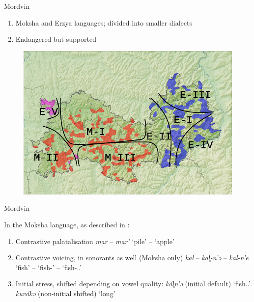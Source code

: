 \documentclass[10 pt, handout]{beamer}
\begin{document}
\begin{frame}{Mordvin}

	\begin{enumerate}[$\gg$]
		\item Moksha and Erzya languages; divided into smaller dialects
		\item Endangered but supported 
	\end{enumerate}
	
	\begin{figure}[H]
		\centering
		\includegraphics[scale=.3]{moksha-dialects}
	\end{figure}

\end{frame}

\begin{frame}{Mordvin}

	In the Moksha language, as described in \parencite{toldovaetal2018}:

	\begin{enumerate}[$\gg$]
		\item Contrastive palatalisation
			\ex \emph{mar} -- \emph{mar'} \hfill `pile' -- `apple'
			\xe
		\item Contrastive voicing, in sonorants as well (Moksha only)
			\ex \emph{kal} -- \emph{kal̥-n'ə} -- \emph{kal-n'e} \hfill `fish' -- `fish-{\Pl}' -- `fish-{\Fsg}.{\Poss}.{\Pl}'
			\xe
		\item Initial stress, shifted depending on vowel quality:
			\pex
				\a \emph{k{\'a}l̥n'ə} (initial default) \hfill `fish.{\Def}.{\Pl}'
				\a \emph{kuv{\'a}kə} (non-initial shifted) \hfill `long'
			\xe
	\end{enumerate}

\end{frame}
\end{document}
